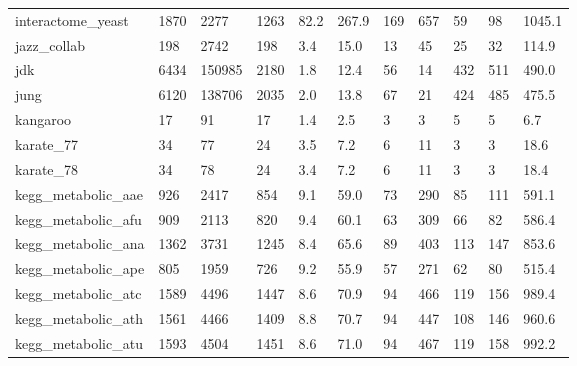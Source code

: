 \begin{longtable}{lllllllllll}
 interactome\_yeast                                  & 1870       & 2277      & 1263  & 82.2   & 267.9  & 169   & 657    & 59     & 98     & 1045.1  \\
 jazz\_collab                                        & 198        & 2742      & 198   & 3.4    & 15.0   & 13    & 45     & 25     & 32     & 114.9   \\
 jdk                                                & 6434       & 150985    & 2180  & 1.8    & 12.4   & 56    & 14     & 432    & 511    & 490.0   \\
 jung                                               & 6120       & 138706    & 2035  & 2.0    & 13.8   & 67    & 21     & 424    & 485    & 475.5   \\
 kangaroo                                           & 17         & 91        & 17    & 1.4    & 2.5    & 3     & 3      & 5      & 5      & 6.7     \\
 karate\_77                                          & 34         & 77        & 24    & 3.5    & 7.2    & 6     & 11     & 3      & 3      & 18.6    \\
 karate\_78                                          & 34         & 78        & 24    & 3.4    & 7.2    & 6     & 11     & 3      & 3      & 18.4    \\
 kegg\_metabolic\_aae                                 & 926        & 2417      & 854   & 9.1    & 59.0   & 73    & 290    & 85     & 111    & 591.1   \\
 kegg\_metabolic\_afu                                 & 909        & 2113      & 820   & 9.4    & 60.1   & 63    & 309    & 66     & 82     & 586.4   \\
 kegg\_metabolic\_ana                                 & 1362       & 3731      & 1245  & 8.4    & 65.6   & 89    & 403    & 113    & 147    & 853.6   \\
 kegg\_metabolic\_ape                                 & 805        & 1959      & 726   & 9.2    & 55.9   & 57    & 271    & 62     & 80     & 515.4   \\
 kegg\_metabolic\_atc                                 & 1589       & 4496      & 1447  & 8.6    & 70.9   & 94    & 466    & 119    & 156    & 989.4   \\
 kegg\_metabolic\_ath                                 & 1561       & 4466      & 1409  & 8.8    & 70.7   & 94    & 447    & 108    & 146    & 960.6   \\
 kegg\_metabolic\_atu                                 & 1593       & 4504      & 1451  & 8.6    & 71.0   & 94    & 467    & 119    & 158    & 992.2   \\

\end{longtable}
